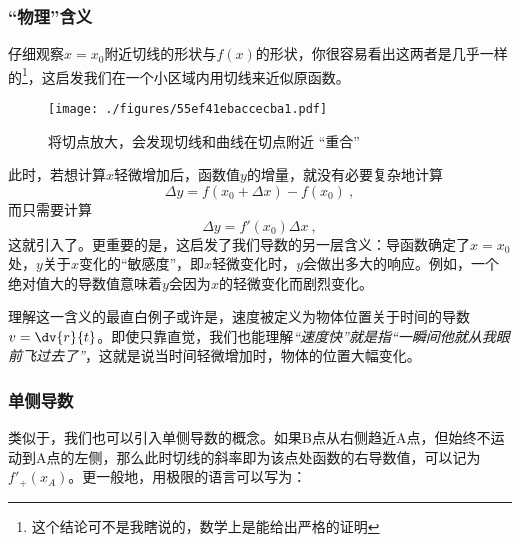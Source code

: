 \subsubsection{“物理”含义}
仔细观察$x=x_0$附近切线的形状与$f(x)$的形状，你很容易看出这两者是几乎一样的\footnote{这个结论可不是我瞎说的，数学上是能给出严格的证明}，这启发我们在一个小区域内用切线来近似原函数。

\begin{figure}[ht]
\centering
\texttt{[image: ./figures/55ef41ebaccecba1.pdf]}
\caption{将切点放大，会发现切线和曲线在切点附近 “重合”}\label{fig_Der_1}
\end{figure}

此时，若想计算$x$轻微增加后，函数值$y$的增量，就没有必要复杂地计算
$$\Delta y = f(x_0+\Delta x) - f(x_0)~,$$
而只需要计算
\begin{equation}
\Delta y = f'(x_0) \Delta x~,
\end{equation}
这就引入了。更重要的是，这启发了我们导数的另一层含义：导函数确定了$x=x_0$处，$y$关于$x$变化的“敏感度”，即$x$轻微变化时，$y$会做出多大的响应。例如，一个绝对值大的导数值意味着$y$会因为$x$的轻微变化而剧烈变化。

理解这一含义的最直白例子或许是，速度被定义为物体位置关于时间的导数$v=\dv{r}{t}$。即使只靠直觉，我们也能理解\textsl{“速度快”就是指“一瞬间他就从我眼前飞过去了”}，这就是说当时间轻微增加时，物体的位置大幅变化。


\subsubsection{单侧导数}
类似于，我们也可以引入单侧导数的概念。如果B点从右侧趋近A点，但始终不运动到A点的左侧，那么此时切线的斜率即为该点处函数的右导数值，可以记为$f'_+(x_A)$。更一般地，用极限的语言可以写为：

